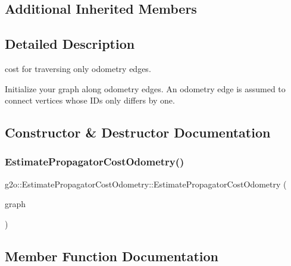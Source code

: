 \subsection*{Additional Inherited Members}


\subsection{Detailed Description}
cost for traversing only odometry edges. 

Initialize your graph along odometry edges. An odometry edge is assumed to connect vertices whose I\+Ds only differs by one. 

\subsection{Constructor \& Destructor Documentation}
\mbox{\label{classg2o_1_1_estimate_propagator_cost_odometry_a426a53e3cce07b71a129cc53754e9f1a}} 
\subsubsection{\texorpdfstring{Estimate\+Propagator\+Cost\+Odometry()}{EstimatePropagatorCostOdometry()}}
{\footnotesize\ttfamily g2o\+::\+Estimate\+Propagator\+Cost\+Odometry\+::\+Estimate\+Propagator\+Cost\+Odometry (\begin{DoxyParamCaption}\item[{\mbox{\hyperlink{classg2o_1_1_sparse_optimizer}{Sparse\+Optimizer}} $\ast$}]{graph }\end{DoxyParamCaption})}



\subsection{Member Function Documentation}
\mbox{\label{classg2o_1_1_estimate_propagator_cost_odometry_a6e610e7413e8973453943c5b4b9423aa}} 
